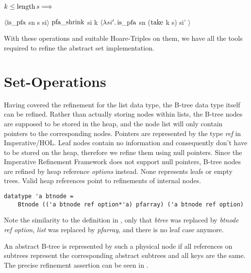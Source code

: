 \begin{lemma}
    $k \le \operatorname{length} s\Longrightarrow$ \\
    \begin{center}
    $\langle \operatorname{is\_pfa}$ sn s si$\rangle$
    $\operatorname{pfa\_shrink}$ si k
    $\langle\lambda si'. \operatorname{is\_pfa}$ sn ($\operatorname{take}$ k s) si' $\rangle$
    \end{center}
\end{lemma}

With these operations and suitable Hoare-Triples on them,
we have all the tools required to refine the abstract set implementation.

\section{Set-Operations}

Having covered the refinement for the list data type,
the B-tree data type itself can be refined.
Rather than actually storing nodes within lists,
the B-tree nodes are supposed to be stored in the heap,
and the node list will only contain pointers to the corresponding nodes.
Pointers are represented by the type \textit{ref} in Imperative/HOL.
Leaf nodes contain no information and consequently don't have to be stored
on the heap, therefore we refine them using null pointers.
Since the Imperative Refinement Framework does not support null pointers,
B-tree nodes are refined by heap reference \textit{options} instead.
None represents leafs or empty trees.
Valid heap references point to refinements of internal nodes.

\begin{lstlisting}[mathescape=true, language=Isabelle]
datatype 'a btnode =
    Btnode (('a btnode ref option*'a) pfarray) ('a btnode ref option)
\end{lstlisting}

Note the similarity to the definition in ,
only that \textit{btree} was replaced by \textit{btnode ref option},
\textit{list} was replaced by \textit{pfarray},
and there is no leaf case anymore.

An abstract B-tree is represented by such a physical node
if all references on subtrees represent the corresponding
abstract subtrees and all keys are the same.
The precise refinement assertion can be seen in .

